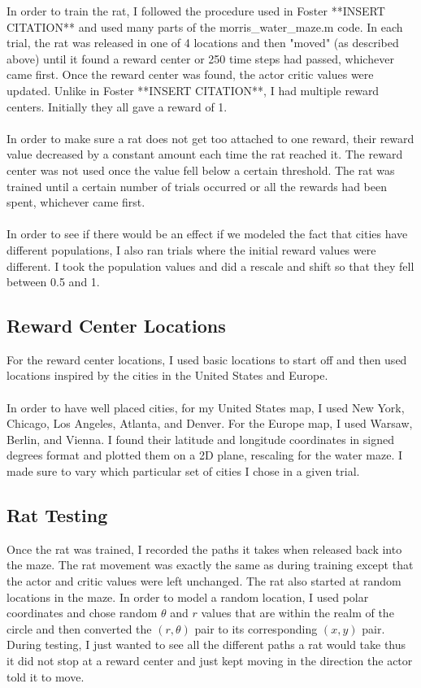 \documentclass[conference]{IEEEtran}
\begin{document}
In order to train the rat, I followed the procedure used in Foster **INSERT CITATION** and used many parts of the morris\_water\_maze.m code. In each trial, the rat was released in one of 4 locations and then "moved" (as described above) until it found a reward center or 250 time steps had passed, whichever came first. Once the reward center was found, the actor critic values were updated. Unlike in Foster **INSERT CITATION**, I had multiple reward centers. Initially they all gave a reward of 1.\\
\\
In order to make sure a rat does not get too attached to one reward, their reward value decreased by a constant amount each time the rat reached it. The reward center was not used once the value fell below a certain threshold. The rat was trained until a certain number of trials occurred or all the rewards had been spent, whichever came first. \\
\\
In order to see if there would be an effect if we modeled the fact that cities have different populations, I also ran trials where the initial reward values were different. I took the population values and did a rescale and shift so that they fell between 0.5 and 1. 

\subsection{Reward Center Locations}
For the reward center locations, I used basic locations to start off and then used locations inspired by the cities in the United States and Europe. \\
\\
In order to have well placed cities, for my United States map, I used New York, Chicago, Los Angeles, Atlanta, and Denver. For the Europe map, I used Warsaw, Berlin, and Vienna. I found their latitude and longitude coordinates in signed degrees format and plotted them on a 2D plane, rescaling for the water maze. I made sure to vary which particular set of cities I chose in a given trial. 

\subsection{Rat Testing}

Once the rat was trained, I recorded the paths it takes when released back into the maze. The rat movement was exactly the same as during training except that the actor and critic values were left unchanged. The rat also started at random locations in the maze. In order to model a random location, I used polar coordinates and chose random $\theta$ and $r$ values that are within the realm of the circle and then converted the $(r,\theta)$ pair to its corresponding $(x,y)$ pair. During testing, I just wanted to see all the different paths a rat would take thus it did not stop at a reward center and just kept moving in the direction the actor told it to move.
\end{document}
